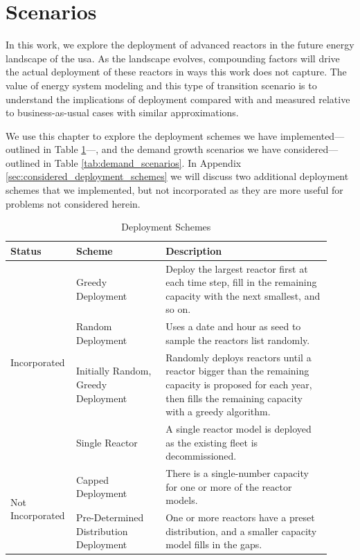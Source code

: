 \section{Scenarios}
\label{sec:scenarios}

In this work, we explore the deployment of advanced reactors in the future
energy landscape of the \gls{usa}. As the landscape evolves, compounding
factors will drive the actual deployment of these reactors in ways this work
does not capture. The value of energy system modeling and this type of
transition scenario is to understand the implications of deployment compared
with and measured relative to business-as-usual cases with similar
approximations.

We use this chapter to explore the deployment schemes we have
implemented---outlined in Table \ref{tab:deployment_schemes}---, and the demand
growth scenarios we have considered---outlined in Table
\ref{tab:demand_scenarios}. In Appendix \ref{sec:considered_deployment_schemes}
we will discuss two additional deployment schemes that we implemented, but
not incorporated as they are more useful for problems not considered herein.

\begin{table}[H]
    \centering
    \caption{Deployment Schemes}
    \label{tab:deployment_schemes}
    \begin{tabular}{p{0.15\linewidth} p{0.27\linewidth} p{0.50\linewidth}}
        \hline
        \textbf{Status} & \textbf{Scheme} & \textbf{Description} \\
        \hline
        \multirow{4}{*}{Incorporated} & Greedy Deployment & Deploy the largest
        reactor first at each time step, fill in the remaining capacity with
        the next smallest, and so on. \\
        & Random Deployment & Uses a date and hour as seed to sample the
        reactors list randomly. \\
        & Initially Random, Greedy Deployment & Randomly deploys reactors until
        a reactor bigger than the remaining capacity is proposed for each year,
        then fills the remaining capacity with a greedy algorithm. \\
        & Single Reactor & A single reactor model is deployed as the existing fleet is decommissioned.\\
        \hline
        \multirow{2}{*}{Not Incorporated} & Capped Deployment & There is a
        single-number capacity for one or more of the reactor models. \\
        & Pre-Determined Distribution Deployment & One or more reactors have a
        preset distribution, and a smaller capacity model fills in the gaps. \\
        \hline
    \end{tabular}
\end{table}

